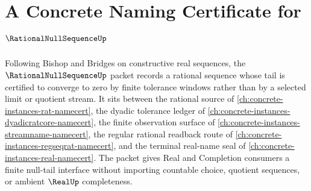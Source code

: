 \chapter{A Concrete Naming Certificate for $\RationalNullSequenceUp$}
\label{ch:concrete-instances-rational-null-sequence-namecert}

Following Bishop and Bridges on constructive real sequences, the $\RationalNullSequenceUp$ packet records a rational sequence whose tail is certified to converge to zero by finite tolerance windows rather than by a selected limit or quotient stream. It sits between the rational source of \autoref{ch:concrete-instances-rat-namecert}, the dyadic tolerance ledger of \autoref{ch:concrete-instances-dyadicratcore-namecert}, the finite observation surface of \autoref{ch:concrete-instances-streamname-namecert}, the regular rational readback route of \autoref{ch:concrete-instances-regseqrat-namecert}, and the terminal real-name seal of \autoref{ch:concrete-instances-real-namecert}. The packet gives Real and Completion consumers a finite null-tail interface without importing countable choice, quotient sequences, or ambient $\RealUp$ completeness.

